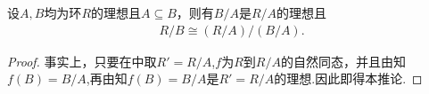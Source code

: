\documentclass[../../main.tex]{subfiles}%
\begin{document}
\begin{corollary}\label{corollary:抽象代数--推论1.7.2}
设$A,B$均为环$R$的理想且$A \subseteq B$，则有$B/A$是$R/A$的理想且
\begin{align*}
R/B \cong (R/A)/(B/A). 
\end{align*}
\end{corollary}
\begin{proof}

事实上，只要在中取$R' = R/A$,$f$为$R$到$R/A$的自然同态，并且由知$f(B)=B/A$,再由知$f(B)=B/A$是$R'=R/A$的理想.因此即得本推论.

\end{proof}
\end{document}
